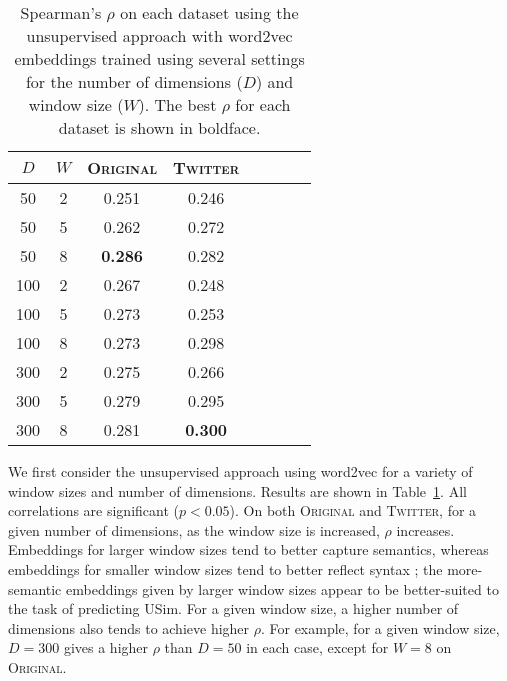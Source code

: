 \documentclass[11pt]{article}
\newcommand\original{\textsc{Original}\xspace}
\newcommand\twitter{\textsc{Twitter}\xspace}
\newcommand{\tabref}[1]{Table~\ref{#1}}
\begin{document}
\begin{table}
\begin{center}
\begin{tabular}{cc|ccc|ccc}
$D$ & $W$ & \textsc{Original} & \textsc{Twitter} \\
\hline
50 & 2  & 0.251 & 0.246 \\
50 & 5  & 0.262 & 0.272 \\
50 & 8  & \textbf{0.286} & 0.282 \\
\hline
100 & 2 & 0.267 & 0.248 \\
100 & 5 & 0.273 & 0.253 \\
100 & 8 & 0.273 & 0.298 \\
\hline
300 & 2 & 0.275 & 0.266 \\
300 & 5 & 0.279   & 0.295 \\
300 & 8 & 0.281 & \textbf{0.300} \\
\hline
\end{tabular}
\caption{Spearman's $\rho$ on each dataset using the unsupervised
  approach with word2vec embeddings trained using several settings for
  the number of dimensions ($D$) and window size ($W$). The best
  $\rho$ for each dataset is shown in boldface.\label{tbl:w2vresults}}
\end{center}
\end{table}



We first consider the unsupervised approach using word2vec for a
variety of window sizes and number of dimensions. Results are shown in
\tabref{tbl:w2vresults}. All correlations are significant
($p<0.05$). On both \original and \twitter, for a given number of
dimensions, as the window size is increased, $\rho$
increases. Embeddings for larger window sizes tend to better capture
semantics, whereas embeddings for smaller window sizes tend to better
reflect syntax \cite{levy2014dependency}; the more-semantic
embeddings given by larger window sizes appear to be better-suited to
the task of predicting USim. For a given window size, a higher number
of dimensions also tends to achieve higher $\rho$. For example, for a
given window size, $D=300$ gives a higher $\rho$ than $D=50$ in each
case, except for $W=8$ on \original.


\end{document}
